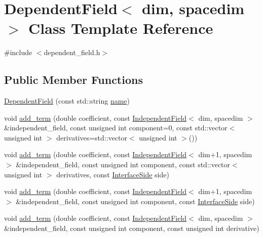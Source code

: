 \hypertarget{class_dependent_field}{}\section{Dependent\+Field$<$ dim, spacedim $>$ Class Template Reference}
\label{class_dependent_field}


{\ttfamily \#include $<$dependent\+\_\+field.\+h$>$}

\subsection*{Public Member Functions}
\begin{DoxyCompactItemize}
\item 
\hyperlink{class_dependent_field_a5a47b8f5b0e51b29bf6f3ca6e18fda9c}{Dependent\+Field} (const std\+::string \hyperlink{class_dependent_field_a698b255f131279d1edb97b3c525153a0}{name})
\item 
void \hyperlink{class_dependent_field_a0726cab14197769ad07bd8f071e395ea}{add\+\_\+term} (double coefficient, const \hyperlink{class_independent_field}{Independent\+Field}$<$ dim, spacedim $>$ \&independent\+\_\+field, const unsigned int component=0, const std\+::vector$<$ unsigned int $>$ derivatives=std\+::vector$<$ unsigned int $>$())
\item 
void \hyperlink{class_dependent_field_a852ed477f6ee71ad85a6690d4a5e56fe}{add\+\_\+term} (double coefficient, const \hyperlink{class_independent_field}{Independent\+Field}$<$ dim+1, spacedim $>$ \&independent\+\_\+field, const unsigned int component, const std\+::vector$<$ unsigned int $>$ derivatives, const \hyperlink{triangulation__system_8h_a44f3c00e36c1d6e3c389ae693c09b435}{Interface\+Side} side)
\item 
void \hyperlink{class_dependent_field_acb8979c891a45ed7326eb47df41c0129}{add\+\_\+term} (double coefficient, const \hyperlink{class_independent_field}{Independent\+Field}$<$ dim+1, spacedim $>$ \&independent\+\_\+field, const unsigned int component, const \hyperlink{triangulation__system_8h_a44f3c00e36c1d6e3c389ae693c09b435}{Interface\+Side} side)
\item 
void \hyperlink{class_dependent_field_a1aaaf072334d4e06640383ae81766a39}{add\+\_\+term} (double coefficient, const \hyperlink{class_independent_field}{Independent\+Field}$<$ dim, spacedim $>$ \&independent\+\_\+field, const unsigned int component, const unsigned int derivative)
\item 

\end{DoxyCompactItemize}
